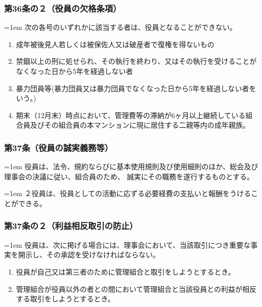 \documentclass[
  luatex,
  paper=a4paper,
  fontsize=11pt,
  jafontsize=11pt,
  jlreq_notes,
]{jlreq}
\newcommand{\joumain}[1]{%
  \noindent\hangindent=1em\hangafter=1
  \hspace{1em}#1%
}
\newcommand{\kou}[2]{%
  \par\noindent\hangindent=1em\hangafter=1
  #1\hspace{1em}#2%
}
\begin{document}
  \subsubsection*{第36条の２（役員の欠格条項）}
  \joumain{次の各号のいずれかに該当する者は、役員となることができない。}
  \begin{enumerate}
    \item 成年被後見人若しくは被保佐人又は破産者で復権を得ないもの
    \item 禁錮以上の刑に処せられ、その執行を終わり、又はその執行を受けることがなくなった日から5年を経過しない者
    \item 暴力団員等(暴力団員又は暴力団員でなくなった日から5年を経過しない者をいう。)
    \item 期末（12月末）時点において、管理費等の滞納が6ヶ月以上継続している組合員及びその組合員の本マンションに現に居住する二親等内の成年親族。
  \end{enumerate}

  \subsubsection*{第37条（役員の誠実義務等）}
  \joumain{役員は、法令、規約ならびに基本使用規則及び使用細則のほか、総会及び理事会の決議に従い、組合員のため、
  誠実にその職務を遂行するものとする。}
  \kou{２}{役員は、役員としての活動に応ずる必要経費の支払いと報酬をうけることができる。}

  \subsubsection*{第37条の２（利益相反取引の防止）}
  \joumain{役員は、次に掲げる場合には、理事会において、当該取引につき重要な事実を開示し、その承認を受けなければならない。}
  \begin{enumerate}
    \item 役員が自己又は第三者のために管理組合と取引をしようとするとき。
    \item 管理組合が役員以外の者との間において管理組合と当該役員との利益が相反する取引をしようとするとき。
  \end{enumerate}
\end{document}

